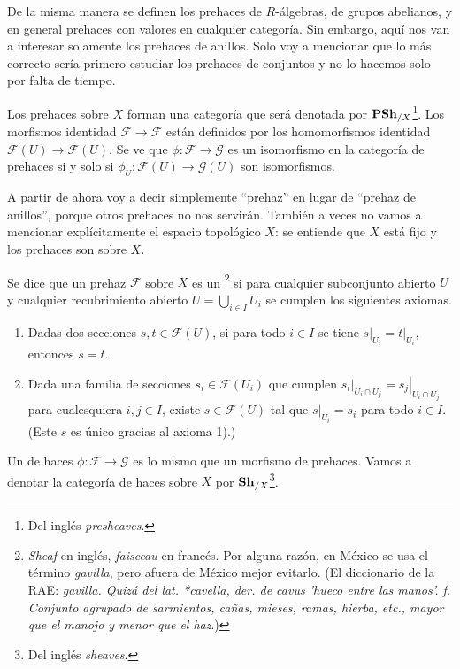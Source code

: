 \documentclass{article}
\numberwithin{equation}{section}
\theoremstyle{definition}
\begin{document}
\begin{comentario}
  De la misma manera se definen los prehaces de $R$-álgebras, de grupos
  abelianos, y en general prehaces con valores en cualquier categoría.
  Sin embargo, aquí nos van a interesar solamente los prehaces de anillos.
  Solo voy a mencionar que lo más correcto sería primero estudiar los prehaces
  de conjuntos y no lo hacemos solo por falta de tiempo.
\end{comentario}

Los prehaces sobre $X$ forman una categoría que será denotada por
$\text{\bf PSh}_{/X}$\footnote{Del inglés \emph{presheaves}.}. Los morfismos
identidad ${\mathcal{F} \to \mathcal{F}}$ están definidos por los homomorfismos
identidad $\mathcal{F} (U) \to \mathcal{F} (U)$. Se ve que
$\phi\colon \mathcal{F} \to \mathcal{G}$ es un isomorfismo en la categoría
de prehaces si y solo si ${\phi_U\colon \mathcal{F} (U) \to \mathcal{G} (U)}$
son isomorfismos.

A partir de ahora voy a decir simplemente ``prehaz'' en lugar de ``prehaz de
anillos'', porque otros prehaces no nos servirán. También a veces no vamos
a mencionar explícitamente el espacio topológico $X$: se entiende que $X$ está
fijo y los prehaces son sobre $X$.

\begin{definicion}
  \label{dfn:haces}
  Se dice que un prehaz $\mathcal{F}$ sobre $X$ es un
  \footnote{\emph{Sheaf} en inglés, \emph{faisceau} en francés. Por
    alguna razón, en México se usa el término \emph{gavilla}, pero afuera de
    México mejor evitarlo. (El diccionario de la RAE: \emph{gavilla. Quizá del
      lat. *cavella, der. de cavus 'hueco entre las manos'. f. Conjunto agrupado
      de sarmientos, cañas, mieses, ramas, hierba, etc., mayor que el manojo y
      menor que el haz}.)} si para cualquier subconjunto abierto $U$ y cualquier
  recubrimiento abierto $U = \bigcup_{i\in I} U_i$ se cumplen los siguientes
  axiomas.

  \begin{enumerate}
  \item[1)] Dadas dos secciones $s,t \in \mathcal{F} (U)$, si para todo $i\in I$
    se tiene $\left.s\right|_{U_i} = \left.t\right|_{U_i}$, entonces $s = t$.

  \item[2)] Dada una familia de secciones $s_i \in \mathcal{F} (U_i)$ que
    cumplen $\left.s_i\right|_{U_i\cap U_j} = \left.s_j\right|_{U_i\cap U_j}$
    para cualesquiera $i,j\in I$, existe $s \in \mathcal{F} (U)$ tal que
    $\left.s\right|_{U_i} = s_i$ para todo $i \in I$. (Este $s$ es único gracias
    al axioma 1).)
  \end{enumerate}

  Un  de haces $\phi\colon \mathcal{F} \to \mathcal{G}$ es lo
  mismo que un morfismo de prehaces. Vamos a denotar la categoría de haces sobre
  $X$ por $\text{\bf Sh}_{/X}$\footnote{Del inglés \emph{sheaves}.}.
\end{definicion}
\end{document}
